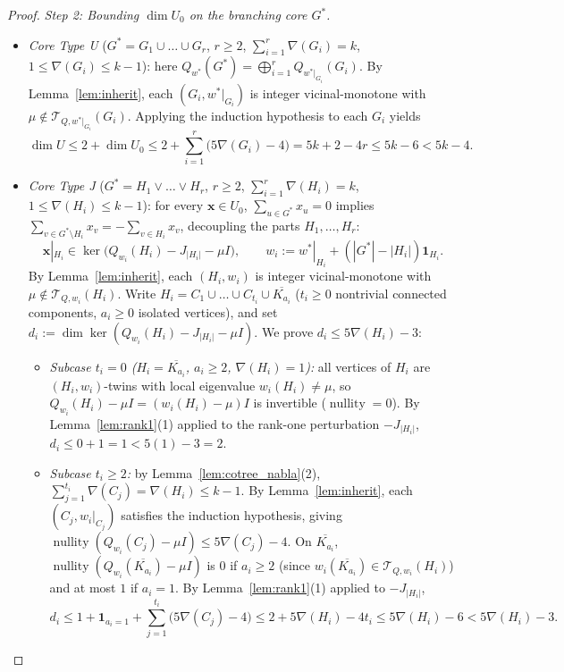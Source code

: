 \documentclass[11pt,a4paper]{article}
\theoremstyle{definition}
\DeclareMathOperator{\nullity}{nullity}
\begin{document}
\begin{proof}
  \emph{Step 2: Bounding $\dim U_0$ on the branching core $G^*$.}
  \begin{itemize}
    \item \emph{Core Type U} ($G^* = G_1 \cup \dots \cup G_r$, $r \ge 2$, $\sum_{i=1}^r \nabla(G_i) = k$, $1 \le \nabla(G_i) \le k-1$): here $Q_{w^*}(G^*) = \bigoplus_{i=1}^r Q_{w^*|_{G_i}}(G_i)$. By Lemma~\ref{lem:inherit}, each $(G_i, w^*|_{G_i})$ is integer vicinal-monotone with $\mu \notin \mathcal{T}_{Q,w^*|_{G_i}}(G_i)$. Applying the induction hypothesis to each $G_i$ yields
    \[
      \dim U \le 2 + \dim U_0 \le 2 + \sum_{i=1}^r \bigl(5\nabla(G_i) - 4\bigr) = 5k + 2 - 4r \le 5k - 6 < 5k - 4.
    \]
    \item \emph{Core Type J} ($G^* = H_1 \vee \dots \vee H_r$, $r \ge 2$, $\sum_{i=1}^r \nabla(H_i) = k$, $1 \le \nabla(H_i) \le k-1$): for every $\mathbf{x} \in U_0$, $\sum_{u \in G^*} x_u = 0$ implies $\sum_{v \in G^* \setminus H_i} x_v = -\sum_{v \in H_i} x_v$, decoupling the parts $H_1,\dots,H_r$:
    \[
      \mathbf{x}|_{H_i} \in \ker\bigl(Q_{w_i}(H_i) - J_{|H_i|} - \mu I\bigr), \qquad w_i := w^*|_{H_i} + (|G^*| - |H_i|)\mathbf{1}_{H_i}.
    \]
    By Lemma~\ref{lem:inherit}, each $(H_i, w_i)$ is integer vicinal-monotone with $\mu \notin \mathcal{T}_{Q,w_i}(H_i)$. Write $H_i = C_1 \cup \dots \cup C_{t_i} \cup \overline{K_{a_i}}$ ($t_i \ge 0$ nontrivial connected components, $a_i \ge 0$ isolated vertices), and set $d_i := \dim\ker(Q_{w_i}(H_i) - J_{|H_i|} - \mu I)$. We prove $d_i \le 5\nabla(H_i) - 3$:
    \begin{itemize}
      \item \emph{Subcase $t_i = 0$ ($H_i = \overline{K_{a_i}}$, $a_i \ge 2$, $\nabla(H_i) = 1$):} all vertices of $H_i$ are $(H_i, w_i)$-twins with local eigenvalue $w_i(H_i) \ne \mu$, so $Q_{w_i}(H_i) - \mu I = (w_i(H_i) - \mu)I$ is invertible ($\nullity = 0$). By Lemma~\ref{lem:rank1}(1) applied to the rank-one perturbation $-J_{|H_i|}$, $d_i \le 0 + 1 = 1 < 5(1) - 3 = 2$.
      \item \emph{Subcase $t_i \ge 2$:} by Lemma~\ref{lem:cotree_nabla}(2), $\sum_{j=1}^{t_i} \nabla(C_j) = \nabla(H_i) \le k - 1$. By Lemma~\ref{lem:inherit}, each $(C_j, w_i|_{C_j})$ satisfies the induction hypothesis, giving $\nullity(Q_{w_i}(C_j) - \mu I) \le 5\nabla(C_j) - 4$. On $\overline{K_{a_i}}$, $\nullity(Q_{w_i}(\overline{K_{a_i}}) - \mu I)$ is $0$ if $a_i \ge 2$ (since $w_i(\overline{K_{a_i}}) \in \mathcal{T}_{Q,w_i}(H_i)$) and at most $1$ if $a_i = 1$. By Lemma~\ref{lem:rank1}(1) applied to $-J_{|H_i|}$,
      \[
        d_i \le 1 + \mathbf{1}_{a_i = 1} + \sum_{j=1}^{t_i} \bigl(5\nabla(C_j) - 4\bigr) \le 2 + 5\nabla(H_i) - 4t_i \le 5\nabla(H_i) - 6 < 5\nabla(H_i) - 3.
\]
\end{itemize}
\end{itemize}
\end{proof}
\end{document}
